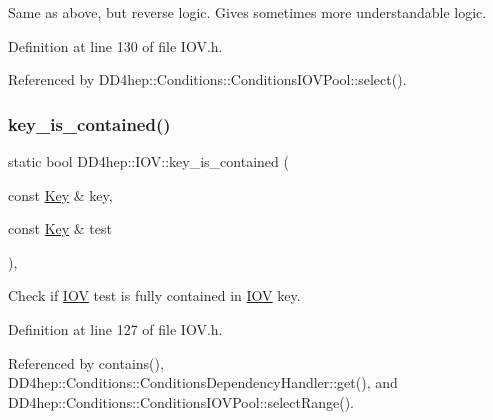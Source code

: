 Same as above, but reverse logic. Gives sometimes more understandable logic. 



Definition at line 130 of file I\+O\+V.\+h.



Referenced by D\+D4hep\+::\+Conditions\+::\+Conditions\+I\+O\+V\+Pool\+::select().

\hypertarget{class_d_d4hep_1_1_i_o_v_a43849b67b7823c3acd522bac26cf179d}{}\label{class_d_d4hep_1_1_i_o_v_a43849b67b7823c3acd522bac26cf179d} 
\subsubsection{\texorpdfstring{key\+\_\+is\+\_\+contained()}{key\_is\_contained()}}
{\footnotesize\ttfamily static bool D\+D4hep\+::\+I\+O\+V\+::key\+\_\+is\+\_\+contained (\begin{DoxyParamCaption}\item[{const \hyperlink{class_d_d4hep_1_1_i_o_v_a07cb46dc875296dc9cccf4ff370104ae}{Key} \&}]{key,  }\item[{const \hyperlink{class_d_d4hep_1_1_i_o_v_a07cb46dc875296dc9cccf4ff370104ae}{Key} \&}]{test }\end{DoxyParamCaption})\hspace{0.3cm}{\ttfamily [inline]}, {\ttfamily [static]}}



Check if \hyperlink{class_d_d4hep_1_1_i_o_v}{I\+OV} \textquotesingle{}test\textquotesingle{} is fully contained in \hyperlink{class_d_d4hep_1_1_i_o_v}{I\+OV} \textquotesingle{}key\textquotesingle{}. 



Definition at line 127 of file I\+O\+V.\+h.



Referenced by contains(), D\+D4hep\+::\+Conditions\+::\+Conditions\+Dependency\+Handler\+::get(), and D\+D4hep\+::\+Conditions\+::\+Conditions\+I\+O\+V\+Pool\+::select\+Range().

\hypertarget{class_d_d4hep_1_1_i_o_v_a2bbff41fece1d4692a155f997fb7aebf}{}\label{class_d_d4hep_1_1_i_o_v_a2bbff41fece1d4692a155f997fb7aebf} 
